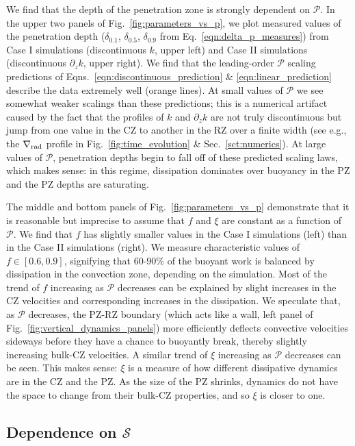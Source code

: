 \documentclass[twocolumn]{aastex631}
\newcommand{\gradrad}{\ensuremath{\nabla_{\rm{rad}}}}
\newcommand{\mP}{\ensuremath{\mathcal{P}}}
\newcommand{\mS}{\ensuremath{\mathcal{S}}}
\begin{document}
We find that the depth of the penetration zone is strongly dependent on $\mP$.
In the upper two panels of Fig.~\ref{fig:parameters_vs_p}, we plot measured values of the penetration depth ($\delta_{0.1}$, $\delta_{0.5}$, $\delta_{0.9}$ from Eq.~\ref{eqn:delta_p_measures}) from Case I simulations (discontinuous $k$, upper left) and Case II simulations (discontinuous $\partial_z k$, upper right).
We find that the leading-order $\mP$ scaling predictions of Eqns.~\ref{eqn:discontinuous_prediction} \& \ref{eqn:linear_prediction} describe the data extremely well (orange lines).
At small values of $\mP$ we see somewhat weaker scalings than these predictions; this is a numerical artifact caused by the fact that the profiles of $k$ and $\partial_z k$ are not truly discontinuous but jump from one value in the CZ to another in the RZ over a finite width (see e.g., the $\gradrad$ profile in Fig.~\ref{fig:time_evolution} \& Sec.~\ref{sct:numerics}).
At large values of $\mP$, penetration depths begin to fall off of these predicted scaling laws, which makes sense: in this regime, dissipation dominates over buoyancy in the PZ and the PZ depths are saturating.

The middle and bottom panels of Fig.~\ref{fig:parameters_vs_p} demonstrate that it is reasonable but imprecise to assume that $f$ and $\xi$ are constant as a function of $\mP$.
We find that $f$ has slightly smaller values in the Case I simulations (left) than in the Case II simulations (right).
We measure characteristic values of $f \in [0.6, 0.9]$, signifying that 60-90\% of the buoyant work is balanced by dissipation in the convection zone, depending on the simulation.
Most of the trend of $f$ increasing as $\mP$ decreases can be explained by slight increases in the CZ velocities and corresponding increases in the dissipation.
We speculate that, as $\mP$ decreases, the PZ-RZ boundary (which acts like a wall, left panel of Fig.~\ref{fig:vertical_dynamics_panels}) more efficiently deflects convective velocities sideways before they have a chance to buoyantly break, thereby slightly increasing bulk-CZ velocities.
A similar trend of $\xi$ increasing as $\mP$ decreases can be seen.
This makes sense: $\xi$ is a measure of how different dissipative dynamics are in the CZ and the PZ.
As the size of the PZ shrinks, dynamics do not have the space to change from their bulk-CZ properties, and so $\xi$ is closer to one.

\subsection{Dependence on $\mS$}
\end{document}
